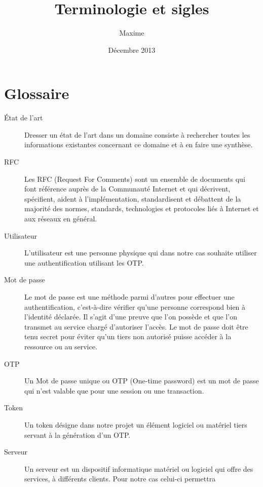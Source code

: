 \documentclass{"../../res/univ-projet"}
\title{Terminologie et sigles}
\author{\bsc{Michotte} Maxime}
\date{Décembre 2013}
\begin{document}
\maketitle
\section{Glossaire}
\begin{description}
	\item[État de l'art]
  	Dresser un état de l'art dans un domaine consiste à rechercher toutes 
  	les informations existantes concernant ce domaine et à en faire une synthèse.
	\\
	\item[RFC]
  	Les RFC (Request For Comments) sont un ensemble de documents qui font 
  	référence auprès de la Communauté Internet et qui décrivent, 
  	spécifient, aident à l'implémentation, standardisent et débattent de 
  	la majorité des normes, standards, technologies et protocoles liés à 
  	Internet et aux réseaux en général.
	\\
	\item[Utilisateur]
  	L'utilisateur est une personne physique qui dans notre cas souhaite utiliser 
  	une authentification utilisant les OTP.
	\\
	\item[Mot de passe]
  	Le mot de passe est une méthode parmi d'autres pour effectuer une
  	authentification, c'est-à-dire vérifier qu'une personne correspond bien à 
  	l'identité déclarée. Il s'agit d'une preuve que l'on possède et que 
  	l'on transmet au service chargé d'autoriser l'accès. Le mot de passe doit être 
  	tenu secret pour éviter qu'un tiers non autorisé puisse accéder à 
  	la ressource ou au service.  
  	\\
	\item[OTP]
  	Un Mot de passe unique ou OTP (One-time password) est un mot de passe qui 
  	n'est valable que pour une session ou une transaction.
	\\
	\item[Token]
  	Un token désigne dans notre projet un élément logiciel ou matériel 
  	tiers servant à la génération d'un OTP.
  	\\
	\item[Serveur]
  	Un serveur est un dispositif informatique matériel ou logiciel qui offre 
  	des services, à différents clients. Pour notre cas celui-ci permettra 

\end{description}
\end{document}
